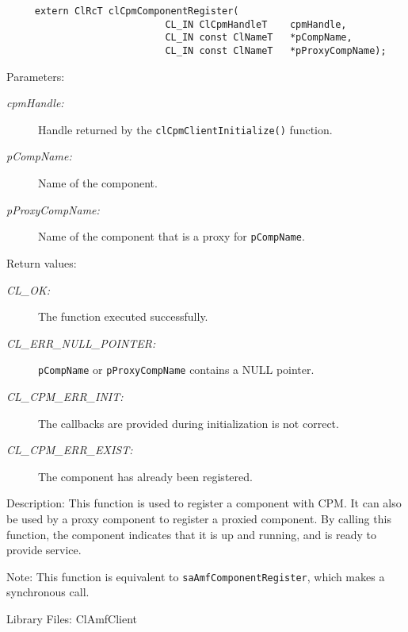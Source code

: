 {\begin{Desc}
\footnotesize\begin{verbatim}     extern ClRcT clCpmComponentRegister(
                			CL_IN ClCpmHandleT    cpmHandle,
                			CL_IN const ClNameT   *pCompName,
                			CL_IN const ClNameT   *pProxyCompName);
\end{verbatim}
\normalsize
\end{Desc}
\begin{Desc}
\item[Parameters:]
\begin{description}
\item[{\em cpm\-Handle:}]Handle returned by the {\tt{cl\-Cpm\-Client\-Initialize()}} function. 
\item[{\em p\-Comp\-Name:}]Name of the component.
\item[{\em p\-Proxy\-Comp\-Name:}]Name of the component that is a proxy for {\tt{p\-Comp\-Name}}.
\end{description}
\end{Desc}
\begin{Desc}
\item[Return values:]
\begin{description}
\item[{\em CL\_\-OK:}]The function executed successfully. 
\item[{\em CL\_\-ERR\_\-NULL\_\-POINTER:}]{\tt{pCompName}} or {\tt{pProxyCompName}} contains a NULL pointer. 
\item[{\em CL\_\-CPM\_\-ERR\_\-INIT:}]The callbacks are provided during initialization is not correct. 
\item[{\em CL\_\-CPM\_\-ERR\_\-EXIST:}] The component has already been registered.
\end{description}
\end{Desc}
\begin{Desc}
\item[Description:]This function is used to register a component with CPM. It can also be used by a proxy component to register a proxied component. By 
calling this function, the component indicates that it is up and running, and is ready to provide service.\end{Desc}
\begin{Desc}
\item[Note:]This function is equivalent to {\tt{sa\-Amf\-Component\-Register}}, which makes a synchronous call.\end{Desc}
\begin{Desc}
\item[Library Files:]Cl\-Amf\-Client\end{Desc}

}
